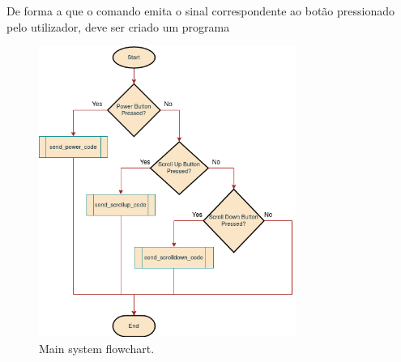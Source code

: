 \documentclass[12pt, letterpaper]{report}
\begin{document}
De forma a que o comando emita o sinal correspondente ao botão pressionado pelo utilizador, deve ser criado um programa 

\begin{figure}[ht]
	\centering
	\includegraphics[width=0.75\textwidth]{Flowchart}
	\caption{Main system flowchart.}
	\label{fig:Flowchart}
\end{figure}
\end{document}
